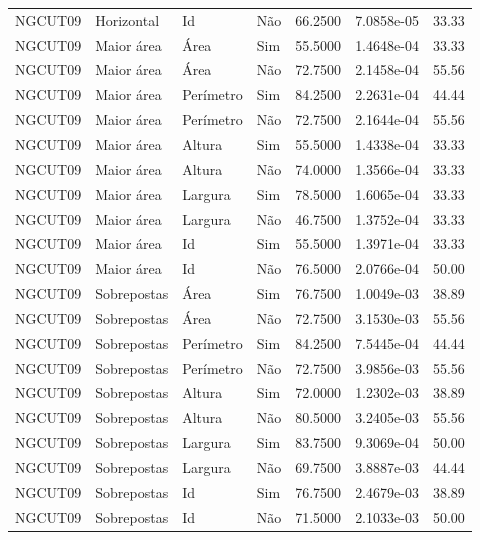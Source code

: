 \begin{tabular}{llllrrr}
NGCUT09   & Horizontal  & Id        & Não         & 66.2500      & 7.0858e-05 & 33.33    \\
NGCUT09   & Maior área  & Área      & Sim         & 55.5000      & 1.4648e-04 & 33.33    \\
NGCUT09   & Maior área  & Área      & Não         & 72.7500      & 2.1458e-04 & 55.56    \\
NGCUT09   & Maior área  & Perímetro & Sim         & 84.2500      & 2.2631e-04 & 44.44    \\
NGCUT09   & Maior área  & Perímetro & Não         & 72.7500      & 2.1644e-04 & 55.56    \\
NGCUT09   & Maior área  & Altura    & Sim         & 55.5000      & 1.4338e-04 & 33.33    \\
NGCUT09   & Maior área  & Altura    & Não         & 74.0000      & 1.3566e-04 & 33.33    \\
NGCUT09   & Maior área  & Largura   & Sim         & 78.5000      & 1.6065e-04 & 33.33    \\
NGCUT09   & Maior área  & Largura   & Não         & 46.7500      & 1.3752e-04 & 33.33    \\
NGCUT09   & Maior área  & Id        & Sim         & 55.5000      & 1.3971e-04 & 33.33    \\
NGCUT09   & Maior área  & Id        & Não         & 76.5000      & 2.0766e-04 & 50.00    \\
NGCUT09   & Sobrepostas & Área      & Sim         & 76.7500      & 1.0049e-03 & 38.89    \\
NGCUT09   & Sobrepostas & Área      & Não         & 72.7500      & 3.1530e-03 & 55.56    \\
NGCUT09   & Sobrepostas & Perímetro & Sim         & 84.2500      & 7.5445e-04 & 44.44    \\
NGCUT09   & Sobrepostas & Perímetro & Não         & 72.7500      & 3.9856e-03 & 55.56    \\
NGCUT09   & Sobrepostas & Altura    & Sim         & 72.0000      & 1.2302e-03 & 38.89    \\
NGCUT09   & Sobrepostas & Altura    & Não         & 80.5000      & 3.2405e-03 & 55.56    \\
NGCUT09   & Sobrepostas & Largura   & Sim         & 83.7500      & 9.3069e-04 & 50.00    \\
NGCUT09   & Sobrepostas & Largura   & Não         & 69.7500      & 3.8887e-03 & 44.44    \\
NGCUT09   & Sobrepostas & Id        & Sim         & 76.7500      & 2.4679e-03 & 38.89    \\
NGCUT09   & Sobrepostas & Id        & Não         & 71.5000      & 2.1033e-03 & 50.00    \\
\hline
\end{tabular}
